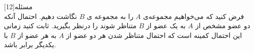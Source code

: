 ‌مسئله[12]  
\\
فرض کنید که می‌خواهیم مجموعه‌ی $A$ را  به مجموعه ی $B$ نگاشت دهیم. احتمال آنکه دو عضو مشخص از $A$ به یک عضو از $B$ متناظر شوند را درنظر بگیرید. ثابت کنید زمانی این احتمال کمینه است که احتمال متناظر شدن هر دو عضو از $A$ به هر عضو از $B$ با یکدیگر برابر باشد.










